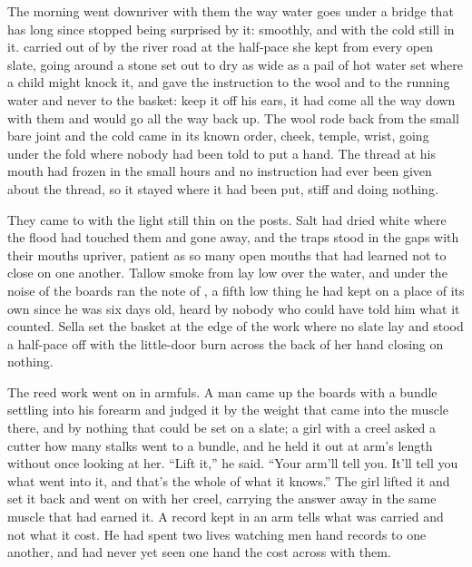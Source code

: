 
The morning went downriver with them the way water goes under a bridge that has long since stopped being surprised by it: smoothly, and with the cold still in it.  carried  out of  by the river road at the half-pace she kept from every open slate, going around a stone set out to dry as wide as a pail of hot water set where a child might knock it, and gave the instruction to the wool and to the running water and never to the basket: keep it off his ears, it had come all the way down with them and would go all the way back up. The wool rode back from the small bare joint and the cold came in its known order, cheek, temple, wrist, going under the fold where nobody had been told to put a hand. The thread at his mouth had frozen in the small hours and no instruction had ever been given about the thread, so it stayed where it had been put, stiff and doing nothing.

They came to  with the light still thin on the posts. Salt had dried white where the flood had touched them and gone away, and the traps stood in the gaps with their mouths upriver, patient as so many open mouths that had learned not to close on one another. Tallow smoke from  lay low over the water, and under the noise of the boards ran the note of , a fifth low thing he had kept on a place of its own since he was six days old, heard by nobody who could have told him what it counted. Sella set the basket at the edge of the work where no slate lay and stood a half-pace off with the little-door burn across the back of her hand closing on nothing.

The reed work went on in armfuls. A man came up the boards with a bundle settling into his forearm and judged it by the weight that came into the muscle there, and by nothing that could be set on a slate; a girl with a creel asked a cutter how many stalks went to a bundle, and he held it out at arm's length without once looking at her. “Lift it,” he said. “Your arm'll tell you. It'll tell you what went into it, and that's the whole of what it knows.” The girl lifted it and set it back and went on with her creel, carrying the answer away in the same muscle that had earned it. A record kept in an arm tells what was carried and not what it cost. He had spent two lives watching men hand records to one another, and had never yet seen one hand the cost across with them.

